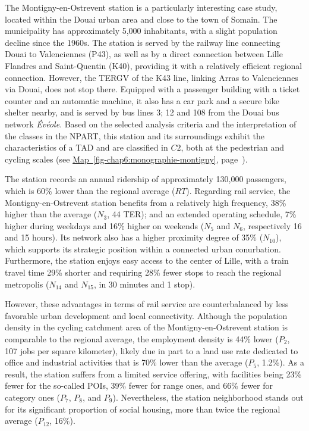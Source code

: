 \begin{refsegment}
The Montigny-en-Ostrevent station is a particularly interesting case study, located within the Douai urban area and close to the town of Somain. The municipality has approximately 5,000 inhabitants, with a slight population decline since the 1960s. The station is served by the railway line connecting Douai to Valenciennes (P43), as well as by a direct connection between Lille Flandres and Saint-Quentin (K40), providing it with a relatively efficient regional connection. However, the \acrshort{TERGV} of the K43 line, linking Arras to Valenciennes via Douai, does not stop there. Equipped with a passenger building with a ticket counter and an automatic machine, it also has a car park and a secure bike shelter nearby, and is served by bus lines 3; 12 and 108 from the Douai bus network \textsl{Évéole}. Based on the selected analysis criteria and the interpretation of the classes in the \acrshort{NPART}, this station and its surroundings exhibit the characteristics of a \acrshort{TAD} and are classified in \(C2\), both at the pedestrian and cycling scales (see \hyperref[fig-chap6:monographie-montigny]{Map~\ref{fig-chap6:monographie-montigny}}, page~\pageref{fig-chap6:monographie-montigny}).%

The station records an annual ridership of approximately 130,000 passengers, which is 60\% lower than the regional average (\(RT\)). Regarding rail service, the Montigny-en-Ostrevent station benefits from a relatively high frequency, 38\% higher than the average (\(N_{3}\), 44 \acrshort{TER}); and an extended operating schedule, 7\% higher during weekdays and 16\% higher on weekends (\(N_{5}\) and \(N_{6}\), respectively 16 and 15 hours). Its network also has a higher proximity degree of 35\% (\(N_{10}\)), which supports its strategic position within a connected urban conurbation. Furthermore, the station enjoys easy access to the center of Lille, with a train travel time 29\% shorter and requiring 28\% fewer stops to reach the regional metropolis (\(N_{14}\) and \(N_{15}\), in 30 minutes and 1 stop).%

However, these advantages in terms of rail service are counterbalanced by less favorable urban development and local connectivity. Although the population density in the cycling catchment area of the Montigny-en-Ostrevent station is comparable to the regional average, the employment density is 44\% lower (\(P_{2}\), 107 jobs per square kilometer), likely due in part to a land use rate dedicated to office and industrial activities that is 70\% lower than the average (\(P_{5}\), 1.2\%). As a result, the station suffers from a limited service offering, with facilities being 23\% fewer for the so-called  \acrshort{POIs}, 39\% fewer for  range ones, and 66\% fewer for  category ones (\(P_{7}\), \(P_{8}\), and \(P_{9}\)). Nevertheless, the station neighborhood stands out for its significant proportion of social housing, more than twice the regional average (\(P_{12}\), 16\%).


\end{refsegment}
